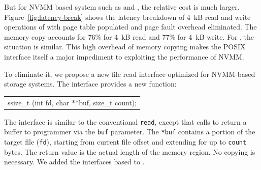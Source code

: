 
But for NVMM based system such as \DAChell{} and \CChell{}, the relative cost
 is much larger.
Figure~\ref{fig:latency-break} shows the latency breakdown of 4~kB read and
write operations of \DAChell{} with page table populated and page fault overhead
eliminated.  The memory copy accounts for 76\% for 4~kB
read and 77\% for 4~kB write. For \CChell{}, the situation is similar.
This high overhead of memory copying makes the POSIX interface
itself a major impediment to exploiting the performance of NVMM.

To eliminate it, we propose a new file read interface optimized for
NVMM-based storage systems.  The interface provides a new function:

\vspace{1em}
\begin{tabular}{l}
ssize\_t \grb{}(int fd, char **buf, size\_t count);\\
\end{tabular}
\vspace{1em}


The interface is similar to the conventional \texttt{read}, except that calls
to \texttt{\grb{}} return a buffer to programmer via the \texttt{buf}
parameter.  The \texttt{*buf} contains a portion of the target file
(\texttt{fd}), starting from current file offset and extending for up to
\texttt{count} bytes.  The return value is the actual length of the memory
region.  No copying is necessary.  We added the \grb{} interfaces based to
\DAChell{}.

